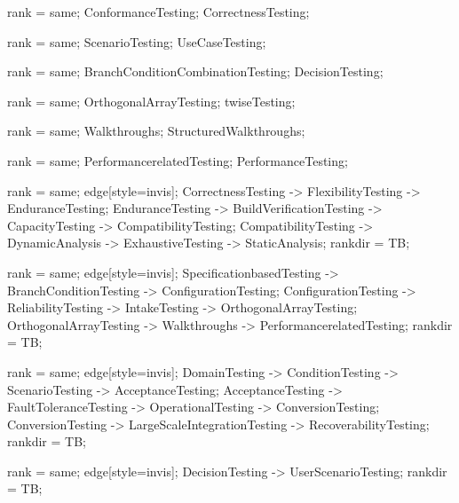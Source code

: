 \documentclass{article}
\begin{document}
{{
rank = same;
ConformanceTesting;
CorrectnessTesting;
}

{
rank = same;
ScenarioTesting;
UseCaseTesting;
}

{
rank = same;
BranchConditionCombinationTesting;
DecisionTesting;
}

{
rank = same;
OrthogonalArrayTesting;
twiseTesting;
}

{
rank = same;
Walkthroughs;
StructuredWalkthroughs;
}

{
rank = same;
PerformancerelatedTesting;
PerformanceTesting;
}

{
rank = same;
edge[style=invis];
CorrectnessTesting -> FlexibilityTesting -> EnduranceTesting;
EnduranceTesting -> BuildVerificationTesting -> CapacityTesting -> CompatibilityTesting;
CompatibilityTesting -> DynamicAnalysis -> ExhaustiveTesting -> StaticAnalysis;
rankdir = TB;
}

{
rank = same;
edge[style=invis];
SpecificationbasedTesting -> BranchConditionTesting -> ConfigurationTesting;
ConfigurationTesting -> ReliabilityTesting -> IntakeTesting -> OrthogonalArrayTesting;
OrthogonalArrayTesting -> Walkthroughs -> PerformancerelatedTesting;
rankdir = TB;
}

{
rank = same;
edge[style=invis];
DomainTesting -> ConditionTesting -> ScenarioTesting -> AcceptanceTesting;
AcceptanceTesting -> FaultToleranceTesting -> OperationalTesting -> ConversionTesting;
ConversionTesting -> LargeScaleIntegrationTesting -> RecoverabilityTesting;
rankdir = TB;
}

{
rank = same;
edge[style=invis];
DecisionTesting -> UserScenarioTesting;
rankdir = TB;
}

}
\end{document}
